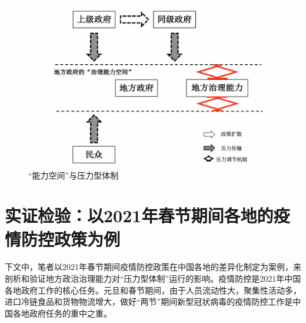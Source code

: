 \documentclass[
  12pt,
]{ctexart}
\begin{document}
\begin{figure}
\includegraphics[width=1\linewidth]{../figures/figure2} \caption{“能力空间”与压力型体制}\label{fig:unnamed-chunk-1}
\end{figure}

\hypertarget{ux5b9eux8bc1ux68c0ux9a8cux4ee52021ux5e74ux6625ux8282ux671fux95f4ux5404ux5730ux7684ux75abux60c5ux9632ux63a7ux653fux7b56ux4e3aux4f8b}{%
\section{实证检验：以2021年春节期间各地的疫情防控政策为例}\label{ux5b9eux8bc1ux68c0ux9a8cux4ee52021ux5e74ux6625ux8282ux671fux95f4ux5404ux5730ux7684ux75abux60c5ux9632ux63a7ux653fux7b56ux4e3aux4f8b}}

下文中，笔者以2021年春节期间疫情防控政策在中国各地的差异化制定为案例，来剖析和验证地方政治治理能力对``压力型体制''运行的影响。疫情防控是2021年中国各地政府工作的核心任务。元旦和春节期间，由于人员流动性大，聚集性活动多，进口冷链食品和货物物流增大，做好``两节''期间新型冠状病毒的疫情防控工作是中国各地政府任务的重中之重。
\end{document}
